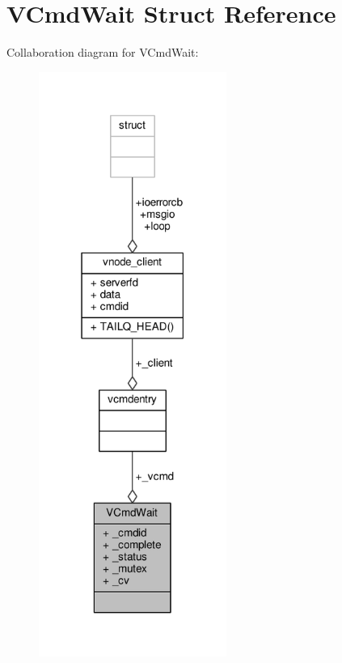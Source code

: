 \hypertarget{struct_v_cmd_wait}{\section{V\+Cmd\+Wait Struct Reference}
\label{struct_v_cmd_wait}
}


Collaboration diagram for V\+Cmd\+Wait\+:
\nopagebreak
\begin{figure}[H]
\begin{center}
\leavevmode
\includegraphics[width=174pt]{struct_v_cmd_wait__coll__graph}
\end{center}
\end{figure}
